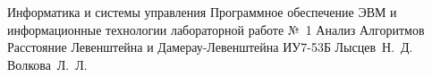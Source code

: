 \documentclass{bmstu}
\begin{document}
\makereporttitle
{Информатика и системы управления} %
{Программное обеспечение ЭВМ и информационные технологии} %
{лабораторной работе №~1} %
{Анализ Алгоритмов} %
{Расстояние Левенштейна и Дамерау-Левенштейна} %
{} %
{ИУ7-53Б} %
{Лысцев~Н.~Д.} %
{Волкова~Л.~Л.} 

\maketableofcontents

% 
% 







\makebibliography

%
\end{document}
